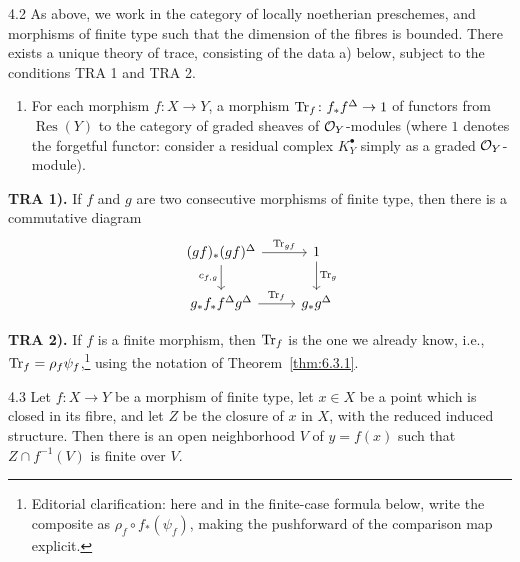 \begin{booktheorem}{4.2}\label{thm:6.4.2}
As above, we work in the category of locally noetherian preschemes, and morphisms of finite type such that the dimension of the fibres is bounded. There exists a unique theory of trace, consisting of the data a) below, subject to the conditions TRA 1 and TRA 2.

\begin{enumerate}
\item[a)] For each morphism $f\colon X\to Y$, a morphism $\operatorname{Tr}_{f}\colon f_{*}f^{\Delta}\to 1$ of functors from $\operatorname{Res}(Y)$ to the category of graded sheaves of $\mathcal{O}_Y$-modules (where $1$ denotes the forgetful functor: consider a residual complex $K_Y^{\bullet}$ simply as a graded $\mathcal{O}_Y$-module).
\end{enumerate}

\medskip{}\label{tra:6.4.1}\noindent\textbf{TRA 1).} If $f$ and $g$ are two consecutive morphisms of finite type, then there is a commutative diagram
\[
\begin{tikzcd}
(gf)_*(gf)^{\Delta} \ar[r,"\Tr_{gf}"] \ar[d,"c_{f,g}"'] & 1 \ar[d,"\Tr_g"] \\
g_*f_* f^{\Delta}g^{\Delta} \ar[r,"\Tr_f"] & g_*g^{\Delta}
\end{tikzcd}
\]

\medskip{}\label{tra:6.4.2}\noindent\textbf{TRA 2).} If $f$ is a finite morphism, then $\operatorname{Tr}_f$ is the one we already know, i.e., $\operatorname{Tr}_f = \rho_f\psi_f$,\footnote{Editorial clarification: here and in the finite-case formula below, write the composite as $\rho_f\circ f_*(\psi_f)$, making the pushforward of the comparison map explicit.} using the notation of Theorem~\ref{thm:6.3.1}.
\end{booktheorem}

\par\endgroup

\begingroup
\setlength{\emergencystretch}{2em}
\begin{booklemma}{4.3}\label{lem:6.4.3}
\cite[\nopp IV,~\S?]{EGA} Let $f\colon X\to Y$ be a morphism of finite type, let $x\in X$ be a point which is closed in its fibre, and let $Z$ be the closure of $x$ in $X$, with the reduced induced structure. Then there is an open neighborhood $V$ of $y=f(x)$ such that $Z\cap f^{-1}(V)$ is finite over $V$.
\end{booklemma}

